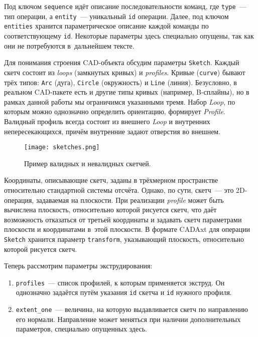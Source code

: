 \newpage

Под ключом \texttt{sequence} идёт описание последовательности команд,
где \texttt{type}~— тип операции, а \texttt{entity}~— уникальный \texttt{id} операции.
Далее, под ключом \texttt{entities} хранится параметрическое описание каждой команды по соответствующему \texttt{id}.
Некоторые параметры здесь специально опущены, так как они не потребуются в~дальнейшем тексте.

Для понимания строения CAD-объекта обсудим параметры \texttt{Sketch}.
Каждый скетч состоит из \textit{loops} (замкнутых кривых) и \textit{profiles}.
Кривые (\texttt{curve}) бывают трёх типов: \texttt{Arc} (дуга), \texttt{Circle} (окружность) и \texttt{Line} (линия).
Безусловно, в реальном CAD-пакете есть и другие типы кривых (например, B-сплайны),
но в рамках данной работы мы ограничимся указанными тремя.
Набор \textit{Loop}, по которым можно однозначно определить ориентацию, формирует \textit{Profile}.
Валидный профиль всегда состоит из внешнего \textit{Loop} и внутренних непересекающихся,
причём внутренние задают отверстия во внешнем.

\begin{figure}[h!]
    \centering
    \texttt{[image: sketches.png]}
    \caption{Пример валидных и невалидных скетчей.}
    \label{fig:sketches}
\end{figure}

Координаты, описывающие скетч, заданы в трёхмерном пространстве относительно стандартной системы отсчёта.
Однако, по сути, скетч~— это 2D-операция, задаваемая на плоскости.
При реализации \textit{profile} может быть вычислена плоскость, относительно которой рисуется скетч,
что даёт возможность отказаться от третьей координаты и задавать скетч параметрами плоскости и координатами в~этой плоскости.
В формате CADAxt для операции \texttt{Sketch} хранится параметр \texttt{transform}, указывающий плоскость,
относительно которой рисуется скетч.

Теперь рассмотрим параметры экструдирования:
\begin{enumerate}
    \item \texttt{profiles}~— список профилей, к которым применяется экструд.
          Он однозначно задаётся путём указания \texttt{id} скетча и \texttt{id} нужного профиля.
    \item \texttt{extent\_one}~— величина, на которую выдавливается скетч по направлению его нормали.
          Направление может меняться при наличии дополнительных параметров, специально опущенных здесь.
\end{enumerate}

